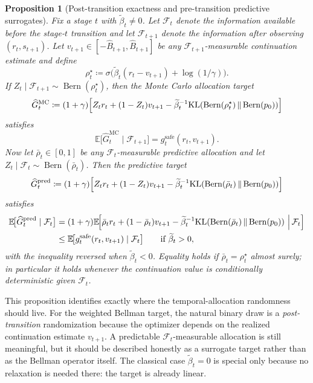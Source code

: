 \documentclass{article}
\newtheorem{proposition}[proposition]{Proposition}
\theoremstyle{remark}
\DeclareMathOperator{\Bern}{Bern}
\newcommand{\E}{\mathbb{E}}
\newcommand{\KL}{\mathrm{KL}}
\newcommand{\defeq}{\coloneqq}
\newcommand{\pprior}{p_0}
\newcommand{\KLbin}[2]{\KL\!\left(\Bern(#1)\,\middle\|\,\Bern(#2)\right)}
\newcommand{\safe}{\mathrm{safe}}
\newcommand{\Bhat}{\widehat B}
\begin{document}
\begin{proposition}[Post-transition exactness and pre-transition predictive surrogates]
\label{prop:mc-relaxation}
Fix a stage $t$ with $\widetilde\beta_t\neq 0$.
Let $\mathcal F_t$ denote the information available before the stage-$t$ transition and let $\mathcal F_{t+1}$ denote the information after observing $(r_t,s_{t+1})$.
Let $v_{t+1}\in[-\Bhat_{t+1},\Bhat_{t+1}]$ be any $\mathcal F_{t+1}$-measurable continuation estimate and define
\[
\rho_t^\star
\defeq
\sigma\!\bigl(\widetilde\beta_t(r_t-v_{t+1})+\log(1/\gamma)\bigr).
\]
If $Z_t\mid \mathcal F_{t+1}\sim \Bern(\rho_t^\star)$, then the Monte Carlo allocation target
\begin{equation}
\widehat G_t^{\mathrm{MC}}
\defeq
(1+\gamma)\Bigl[
Z_t r_t +(1-Z_t)v_{t+1}
-\widetilde\beta_t^{-1}\KLbin{\rho_t^\star}{\pprior}
\Bigr]
\label{eq:mc-target-post}
\end{equation}
satisfies
\begin{equation}
\E\!\bigl[\widehat G_t^{\mathrm{MC}}\mid \mathcal F_{t+1}\bigr]
=
g_t^{\safe}(r_t,v_{t+1}).
\label{eq:mc-target-post-unbiased}
\end{equation}
Now let $\bar\rho_t\in[0,1]$ be any $\mathcal F_t$-measurable predictive allocation and let $Z_t\mid \mathcal F_t\sim \Bern(\bar\rho_t)$.
Then the predictive target
\begin{equation}
\widehat G_t^{\mathrm{pred}}
\defeq
(1+\gamma)\Bigl[
Z_t r_t +(1-Z_t)v_{t+1}
-\widetilde\beta_t^{-1}\KLbin{\bar\rho_t}{\pprior}
\Bigr]
\label{eq:mc-target-pre}
\end{equation}
satisfies
\begin{align}
\E\!\bigl[\widehat G_t^{\mathrm{pred}}\mid \mathcal F_t\bigr]
&=
(1+\gamma)\E\!\Bigl[
\bar\rho_t r_t +(1-\bar\rho_t)v_{t+1}
-\widetilde\beta_t^{-1}\KLbin{\bar\rho_t}{\pprior}
\,\Big|\, \mathcal F_t
\Bigr]
\nonumber\\
&\le \E\!\bigl[g_t^{\safe}(r_t,v_{t+1})\mid \mathcal F_t\bigr]
\qquad \text{if } \widetilde\beta_t>0,
\label{eq:mc-target-pre-bound}
\end{align}
with the inequality reversed when $\widetilde\beta_t<0$.
Equality holds if $\bar\rho_t=\rho_t^\star$ almost surely; in particular it holds whenever the continuation value is conditionally deterministic given $\mathcal F_t$.
\end{proposition}

This proposition identifies exactly where the temporal-allocation randomness should live.
For the weighted Bellman target, the natural binary draw is a \emph{post-transition} randomization because the optimizer depends on the realized continuation estimate $v_{t+1}$.
A predictable $\mathcal F_t$-measurable allocation is still meaningful, but it should be described honestly as a surrogate target rather than as the Bellman operator itself.
The classical case $\widetilde\beta_t=0$ is special only because no relaxation is needed there: the target is already linear.
\end{document}
